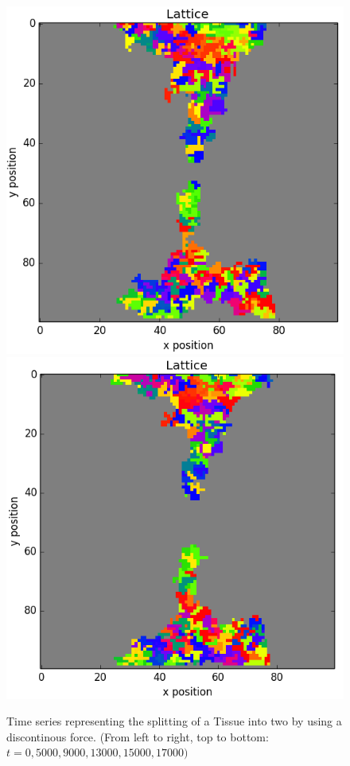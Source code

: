 \documentclass[12pt]{article}
\begin{document}
\begin{figure}[H]
	\includegraphics[scale=0.52]{img/nebula_15000}
	\includegraphics[scale=0.52]{img/nebula_17000}
	\caption{Time series representing the splitting of a Tissue into two by using a discontinous force. (From left to right, top to bottom: $t=0,5000,9000, 13000, 15000,17000)$}
	\label{nebula}
\end{figure}

\newpage


\end{document}
